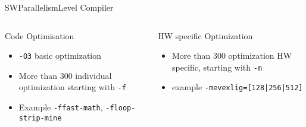%
\begin{Frame}{SWParallelismLevel Compiler}
  \begin{columns}[t]
    \begin{column}{5cm} %
      \begin{block}{Code Optimisation}
        \begin{itemize}
        \item \texttt{-O3} basic optimization
        \item More than 300 individual optimization starting with \texttt{-f}
        \item Example \texttt{-ffast-math}, \texttt{-floop-strip-mine}
        \end{itemize}
      \end{block} 
    \end{column}
    
    \begin{column}{5cm} %
      \begin{block}{HW specific Optimization}
        \begin{itemize}
        \item More than 300 optimization HW specific, starting with
          \texttt{-m}
        \item example \texttt{-mevexlig=[128|256|512]}
        \end{itemize}
      \end{block}   
    \end{column}
  \end{columns}  
\end{Frame}


